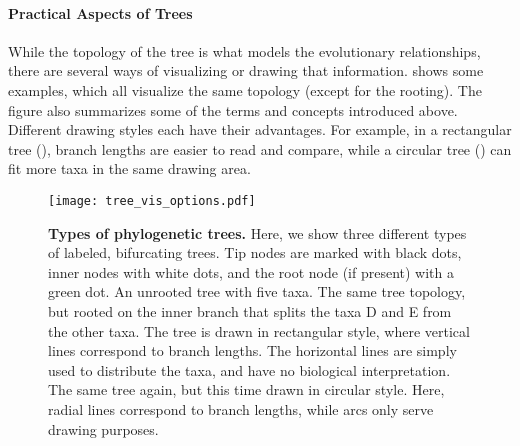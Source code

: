 \paragraph{Practical Aspects of Trees}
\label{ch:Foundations:sec:TreeOfLife:sub:PhylogeneticTrees:par:PracticalAspects}

While the topology of the tree is what models the evolutionary relationships,
there are several ways of visualizing or drawing that information.
 shows some examples, which all visualize the same topology (except for the rooting).
The figure also summarizes some of the terms and concepts introduced above.
Different drawing styles each have their advantages.
For example, in a rectangular tree (),
branch lengths are easier to read and compare,
while a circular tree () can fit more taxa in the same drawing area.

\begin{figure}[hpbt]
    \centering
    \texttt{[image: tree\_vis\_options.pdf]}
    \begin{subfigure}{0pt}
        \label{fig:tree_vis_options:sub:unrooted}
    \end{subfigure}
    \begin{subfigure}{0pt}
        \label{fig:tree_vis_options:sub:rectangular}
    \end{subfigure}
    \begin{subfigure}{0pt}
        \label{fig:tree_vis_options:sub:circular}
    \end{subfigure}
    \caption[Types of phylogenetic trees]{
        \textbf{Types of phylogenetic trees.}
        Here, we show three different types of labeled, bifurcating trees.
        Tip nodes are marked with black dots, inner nodes with white dots, and the root node (if present) with a green dot.
         An unrooted tree with five taxa.
         The same tree topology,
        but rooted on the inner branch that splits the taxa {\sffamily D} and {\sffamily E} from the other taxa.
        The tree is drawn in rectangular style,
        where vertical lines correspond to branch lengths.
        The horizontal lines are simply used to distribute the taxa, and have no biological interpretation.
         The same tree again, but this time drawn in circular style.
        Here, radial lines correspond to branch lengths, while arcs only serve drawing purposes.
    }
    \label{fig:tree_vis_options}
\end{figure}

